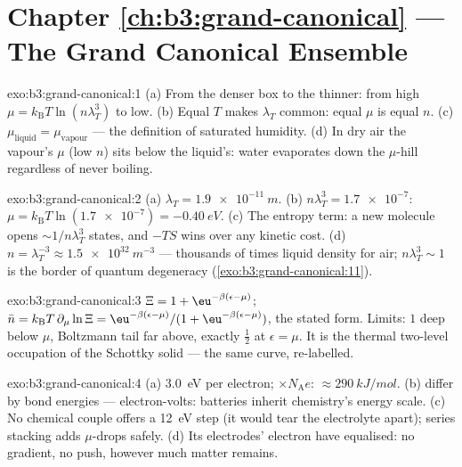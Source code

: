 \section*{Chapter \ref{ch:b3:grand-canonical} --- The Grand Canonical Ensemble}

\begin{solution}{exo:b3:grand-canonical:1}
(a) From the denser box to the thinner: from high $\mu =
k_{\text{B}}T\ln(n\lambda_T^3)$ to low. (b) Equal $T$ makes
$\lambda_T$ common: equal $\mu$ is equal $n$. (c)
$\mu_{\text{liquid}} = \mu_{\text{vapour}}$ --- the definition of
saturated humidity. (d) In dry air the vapour's $\mu$ (low $n$)
sits below the liquid's: water evaporates down the $\mu$-hill
regardless of never boiling.
\end{solution}

\begin{solution}{exo:b3:grand-canonical:2}
(a) $\lambda_T = \qty{1.9e-11}{m}$. (b) $n\lambda_T^3 =
\num{1.7e-7}$: $\mu = k_{\text{B}}T\ln(\num{1.7e-7}) =
\qty{-0.40}{eV}$. (c) The entropy term: a new molecule opens
$\sim1/n\lambda_T^3$ states, and $-TS$ wins over any kinetic cost.
(d) $n = \lambda_T^{-3} \approx \qty{1.5e32}{m^{-3}}$ ---
thousands of times liquid density for air; $n\lambda_T^3 \sim 1$
is the border of quantum degeneracy
(\cref{exo:b3:grand-canonical:11}).
\end{solution}

\begin{solution}{exo:b3:grand-canonical:3}
$\Xi = 1 + \eu^{-\beta(\epsilon-\mu)}$; $\bar n = k_{\text{B}}T\,
\partial_\mu\ln\Xi = \eu^{-\beta(\epsilon-\mu)}/(1 +
\eu^{-\beta(\epsilon-\mu)})$, the stated form. Limits: $1$ deep
below $\mu$, Boltzmann tail far above, exactly $\tfrac12$ at
$\epsilon = \mu$. It is the thermal two-level occupation of the
Schottky solid --- the same curve, re-labelled.
\end{solution}

\begin{solution}{exo:b3:grand-canonical:4}
(a) \qty{3.0}{eV} per electron; $\times N_{\text{A}}e$:
$\approx\qty{290}{kJ/mol}$. (b)  differ by bond
energies --- electron-volts: batteries inherit chemistry's energy
scale. (c) No chemical couple offers a \qty{12}{eV} step (it would
tear the electrolyte apart); series stacking adds $\mu$-drops
safely. (d) Its electrodes' electron  have
equalised: no gradient, no push, however much matter remains.
\end{solution}

